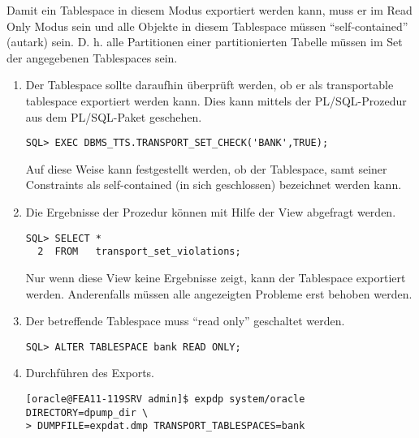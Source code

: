 \begin{itemize}
          Damit ein Tablespace in diesem Modus exportiert werden kann, muss er im Read Only Modus sein und alle Objekte in diesem Tablespace müssen \enquote{self-contained} (autark) sein. D. h. alle Partitionen einer partitionierten Tabelle müssen im Set der angegebenen Tablespaces sein.
          \begin{enumerate}
	    \item Der Tablespace sollte daraufhin überprüft werden, ob er als transportable tablespace exportiert werden kann. Dies kann mittels der PL/SQL-Prozedur  aus dem PL/SQL-Paket  geschehen.
              \begin{lstlisting}[caption={Ausführen von DBMS\_TTS}, label=admin905,language=plsql]
SQL> EXEC DBMS_TTS.TRANSPORT_SET_CHECK('BANK',TRUE);
              \end{lstlisting}
              Auf diese Weise kann festgestellt werden, ob der Tablespace, samt seiner Constraints als self-contained (in sich geschlossen) bezeichnet werden kann.
            \item Die Ergebnisse der Prozedur  können mit Hilfe der View  abgefragt werden.
            \begin{lstlisting}[caption={Die Ergebnisse von DBMS\_TTS.transport\_set\_check}, label=admin906,language=oracle_sql]
SQL> SELECT *
  2  FROM   transport_set_violations;
              \end{lstlisting}
              Nur wenn diese View keine Ergebnisse zeigt, kann der Tablespace exportiert werden. Anderenfalls müssen alle angezeigten Probleme erst behoben werden.
            \item Der betreffende Tablespace muss \enquote{read only} geschaltet werden.
              \begin{lstlisting}[caption={Tablespace Read Only schalten},label=admin907,language=oracle_sql]
SQL> ALTER TABLESPACE bank READ ONLY;
              \end{lstlisting}
            \item Durchführen des Exports.
              \begin{lstlisting}[caption={Transportable Tablespace Export},label=admin908,language=expdp_impdp,emph={[9]DIRECTORY},emphstyle={[9]\sffamily\color{blue}}]
[oracle@FEA11-119SRV admin]$ expdp system/oracle DIRECTORY=dpump_dir \
> DUMPFILE=expdat.dmp TRANSPORT_TABLESPACES=bank
              \end{lstlisting}

\end{enumerate}
\end{itemize}
